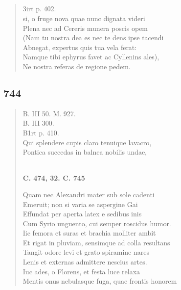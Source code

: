 \documentclass[11pt, a4paper]{report}
\begin{document}
\begin{verse}
      \end{verse}
  
            \subsection*{}
      \begin{verse}
      3irt p. 402. \\ si, o fruge nova quae nunc dignata videri \\ Plena nec ad Cereris munera poscis opem \\ (Nam tu nostra dea es nec te dens ipse tacendi \\ Abnegat, expertus quis tua vela ferat: \\ Namque tibi ephyrus favet ac Cyllenins ales), \\ Ne nostra referas de regione pedem. \\ 
      \end{verse}
  
            \subsection*{744}
      \begin{verse}
      B. III 50. M. 927. \\ B. III 300. \\ B1rt p. 410. \\ Qui splendere cupis claro tenuique lavacro, \\ Pontica succedas in balnea nobilis undae, \\ 
        ﻿\pagebreak 
     \marginpar{[230]} \begin{center} \textbf{C. 474, 32. C. 745} \end{center}Quam nec Alexandri mater sub sole cadenti \\ Emeruit; non si varia se aspergine Gai \\ Effundat per aperta latex e sedibus inis \\ Cum Syrio unguento, cui semper roscidus humor. \\ Iic femora et suras et brachia molliter ambit \\ Et rigat in pluviam, sensimque ad colla resultans \\ Tangit odore levi et grato spiramine nares \\ Lenis et externas admittere nescius artes. \\ Iuc ades, o Florens, et festa luce relaxa \\ Mentis onus nebulasque fuga, quae frontis honorem \\ 
      \end{verse}
  
\end{document}
